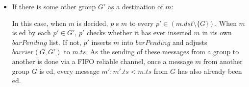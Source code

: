 \documentclass[times, 10pt]{article}
\begin{document}
\begin{itemize}
\begin{itemize}
    \item If there is some other group $G'$ as a destination of $m$:
    
    In this case, when $m$ is decided, $p$ \rmcast{}s $m$ to every \mbox{$p' \in (m.dst \setminus \{G\})$}. When $m$ is \rmdel{}ed by each $p' \in G'$, $p'$ checks whether it has ever inserted $m$ in its own $barPending$ list. If not, $p'$ inserts $m$ into $barPending$ and adjusts $barrier(G, G')$ to $m.ts$. As the sending of these messages from a group to another is done via a FIFO reliable channel, once a message $m$ from another group $G$ is \rmdel{}ed, every message $m' : m'.ts < m.ts$ from $G$ has also already been \rmdel{}ed.
    
  \end{itemize}
%   
% 
%   

\end{itemize}
\end{document}
